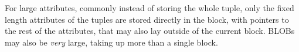 For large attributes, commonly instead of storing the whole tuple, only the fixed length attributes of the tuples are stored directly in the block,
with pointers to the rest of the attributes, that may also lay outside of the current block.
BLOBs may also be \textit{very} large, taking up more than a single block.
